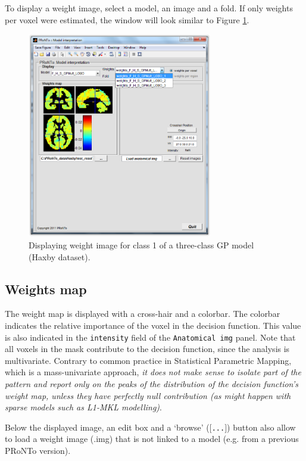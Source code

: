 To display a weight image, select a model, an image and a fold. If only weights per voxel were estimated, the window will look similar to Figure \ref{fig_prt_ui_weights_img}.

\begin{figure}[h!]
\begin{center}
\includegraphics[height=9cm]{images/prt_ui_weights_img.PNG}
\caption{Displaying weight image for class 1 of a three-class GP model (Haxby dataset).}
\label{fig_prt_ui_weights_img}
\end{center}
\end{figure}

\subsection{Weights map}

The weight map is displayed with a cross-hair and a colorbar. The colorbar indicates the
relative importance of the voxel in the decision function. This value is also
indicated in the {\tt intensity} field of the {\tt Anatomical img} panel. Note that all voxels
in the mask contribute to the decision function, since the analysis is multivariate. Contrary
to common practice in Statistical Parametric Mapping, which is a mass-univariate approach, {\em it does
not make sense to isolate part of the pattern and report only on the peaks of the distribution
of the decision function's weight map, unless they have perfectly null contribution (as might happen with sparse models such as L1-MKL modelling)}. 

Below the displayed image, an edit box and a `browse' ($[${\tt ...}$]$) button also allow to load a weight image (.img) that is not linked to a model (e.g. from a previous PRoNTo version).

